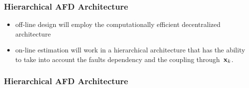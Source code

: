 \documentclass[usenames,dvipsnames]{beamer}
\def\ist{\prescript{1\!}{}}
\def\iind{\prescript{2\!}{}}
\def\iiird{\prescript{3\!}{}}
\begin{document}
\begin{frame}
  \frametitle{Hierarchical AFD Architecture}
  \begin{itemize}
    \item off-line design will employ the computationally efficient decentralized architecture
    \item on-line estimation will work in a hierarchical architecture that has the ability to take into account the faults dependency and the coupling through~$\mathbf{x}_k$.
  \end{itemize}
\end{frame}
\begin{frame}
  \frametitle{Hierarchical AFD Architecture}
\begin{center}
\end{center}
\end{frame}
\end{document}
